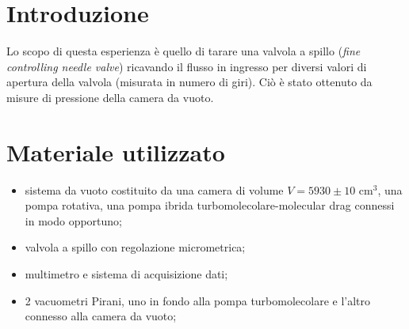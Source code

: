 \section{Introduzione}

Lo scopo di questa esperienza è quello di tarare una valvola a spillo (\textit{fine controlling needle valve}) ricavando il flusso in ingresso per diversi valori di apertura della valvola (misurata in numero di giri). Ciò è stato ottenuto da misure di pressione della camera da vuoto.

\section{Materiale utilizzato}

\begin{itemize}
	\item{sistema da vuoto costituito da una camera di volume $V = 5930 \pm 10$ \si{\centi\metre}$^3$, una pompa rotativa, una pompa ibrida turbomolecolare-molecular drag connessi in modo opportuno;}
	\item{valvola a spillo con regolazione micrometrica;}
	\item{multimetro e sistema di acquisizione dati;}
	\item{2 vacuometri Pirani, uno in fondo alla pompa turbomolecolare e l'altro connesso alla camera da vuoto;}
\end{itemize}
